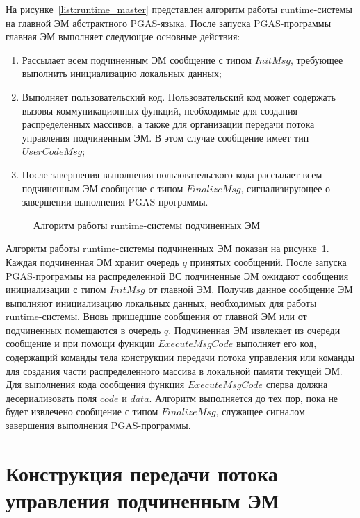 На рисунке~\ref{list:runtime_master} представлен алгоритм работы runtime-системы на главной ЭМ абстрактного PGAS-языка. После запуска PGAS-программы главная ЭМ выполняет следующие основные действия:
\begin{enumerate}
\item Рассылает всем подчиненным ЭМ сообщение с типом $InitMsg$, требующее выполнить инициализацию локальных данных;
\item Выполняет пользовательский код. Пользовательский код может содержать вызовы коммуникационных функций, необходимые для создания распределенных массивов, а также для организации передачи потока управления подчиненным ЭМ. В этом случае сообщение имеет тип $UserCodeMsg$;
\item После завершения выполнения пользовательского кода рассылает всем
  подчиненным ЭМ сообщение с типом $FinalizeMsg$, сигнализирующее о завершении выполнения PGAS-программы.
\end{enumerate}  

\begin{figure}[!h]
	
    \caption{Алгоритм работы runtime-системы подчиненных ЭМ}
    \label{list:runtime_slave}
\end{figure}

Алгоритм работы runtime-системы подчиненных ЭМ показан на
рисунке~\ref{list:runtime_slave}. Каждая подчиненная ЭМ хранит очередь $q$ принятых сообщений. После запуска PGAS-программы на распределенной ВС подчиненные ЭМ ожидают сообщения инициализации с типом $InitMsg$ от главной ЭМ. Получив данное сообщение ЭМ выполняют инициализацию локальных данных, необходимых для работы runtime-системы. Вновь пришедшие сообщения от главной ЭМ или от подчиненных помещаются в очередь $q$. Подчиненная ЭМ извлекает из очереди сообщение и при помощи функции $ExecuteMsgCode$ выполняет его код, содержащий команды тела конструкции передачи потока управления или команды для создания части распределенного массива в локальной памяти текущей ЭМ. Для выполнения кода сообщения функция $ExecuteMsgCode$ сперва должна десериализовать поля $code$ и $data$. Алгоритм выполняется до тех пор, пока не будет извлечено сообщение с типом $FinalizeMsg$, служащее сигналом завершения выполнения PGAS-программы.

\section{Конструкция передачи потока управления подчиненным ЭМ}

